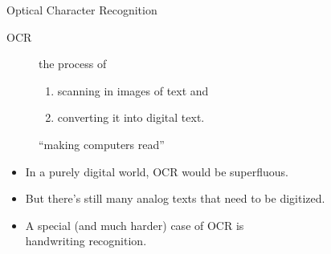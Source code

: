 \documentclass[professionalfonts, xcolor={usenames,svgnames,x11names,table}]{beamer}
\begin{document}
\begin{frame}{Optical Character Recognition}
    \begin{description}
        \item[OCR] the process of
            \begin{enumerate}
                \item scanning in images of text and
                \item converting it into digital text.
            \end{enumerate}
            ``making computers read''
    \end{description}

    \begin{itemize}
        \item In a purely digital world, OCR would be superfluous.
        \item But there's still many analog texts that need to be digitized.\\
        \item A special (and much harder) case of OCR is\\
            handwriting recognition.\\
    \end{itemize}
\end{frame}
\end{document}
